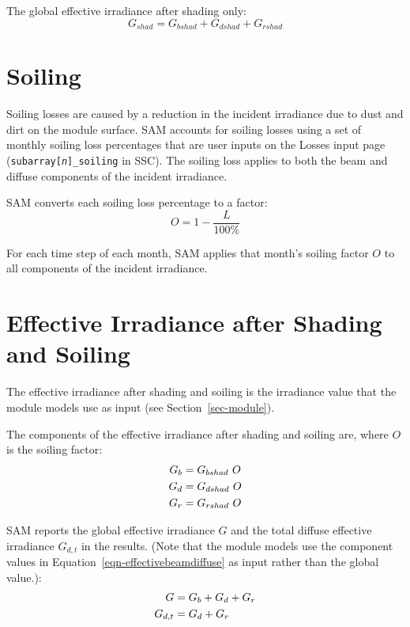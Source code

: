 \documentclass[12pt,letterpaper]{article}
\begin{document}
The global effective irradiance after shading only:
\begin{equation}
G_{shad} = G_{bshad} + G_{dshad} + G_{rshad}
\end{equation}

\section{Soiling}\label{sec-soiling}

Soiling losses are caused by a reduction in the incident irradiance due to dust and dirt on the module surface. SAM accounts for soiling losses using a set of monthly soiling loss percentages that are user inputs on the Losses input page (\texttt{subarray[\textit{n}]\_soiling} in SSC). The soiling loss applies to both the beam and diffuse components of the incident irradiance.

SAM converts each soiling loss percentage to a factor:
\begin{equation}
O=1-\frac{L}{100\%}
\end{equation}

For each time step of each month, SAM applies that month's soiling factor $O$ to all components of the incident irradiance.

\section{Effective Irradiance after Shading and Soiling}

The effective irradiance after shading and soiling is the irradiance value that the module models use as input (see Section~\ref{sec-module}).

The components of the effective irradiance after shading and soiling are, where $O$ is the soiling factor:
\begin{align} \label{eqn-effectivebeamdiffuse}
G_b &= G_{bshad}~O \notag\\
G_d &= G_{dshad}~O\notag\\
G_r &=  G_{rshad}~O
\end{align}

SAM reports the global effective irradiance $G$ and the total diffuse effective irradiance $G_{d,t}$ in the results. (Note that the module models use the component values in Equation~\ref{eqn-effectivebeamdiffuse} as input rather than the global value.):
\begin{align}
G &= G_b + G_d + G_r\notag\\
G_{d,t} & = G_d + G_r
\end{align}
\end{document}
